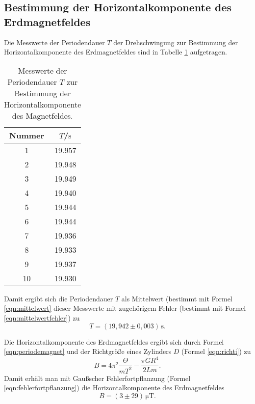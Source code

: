 \FloatBarrier
\subsection{Bestimmung der Horizontalkomponente des Erdmagnetfeldes}

Die Messwerte der Periodendauer $T$ der Drehschwingung zur Bestimmung der Horizontalkomponente
des Erdmagnetfeldes sind in Tabelle \ref{tab:magnetusmaximus} aufgetragen.
\begin{table}
	\caption{Messwerte der Periodendauer $T$ zur Bestimmung der Horizontalkomponente
	des Magnetfeldes.}
	\label{tab:magnetusmaximus}
	\centering
	\begin{tabular}{cc}
		\toprule
		Nummer & $T$/$\si{\second}$ \\
		\midrule
		1      & 19.957             \\
		2      & 19.948             \\
		3      & 19.949             \\
		4      & 19.940             \\
		5      & 19.944             \\
		6      & 19.944             \\
		7      & 19.936             \\
		8      & 19.933             \\
		9      & 19.937             \\
		10     & 19.930             \\
		\bottomrule
	\end{tabular}
\end{table}
Damit ergibt sich die Periodendauer $T$ als Mittelwert (bestimmt mit Formel
\eqref{eqn:mittelwert} dieser Messwerte mit zugehörigem Fehler (bestimmt mit Formel
\eqref{eqn:mittelwertfehler}) zu
\begin{equation*}
	T = (19,942 \pm 0,003) \, \si{\second} \mathrm{.}
\end{equation*}

Die Horizontalkomponente des Erdmagnetfeldes ergibt sich durch Formel \eqref{eqn:periodemagnet}
und der Richtgröße eines Zylinders $D$ (Formel \eqref{eqn:richti}) zu
\begin{equation}
	B = 4\pi^2\frac{\Theta}{m T^2} - \frac{\pi G R^4}{2Lm} \mathrm{.}
\end{equation}
Damit erhält man mit Gaußscher Fehlerfortpflanzung (Formel \eqref{eqn:fehlerfortpflanzung}) die 
Horizontalkomponente des Erdmagnetfeldes 
\begin{equation*}
	B = (3 \pm 29) \, \si{\micro\tesla} \mathrm{.}
\end{equation*}
